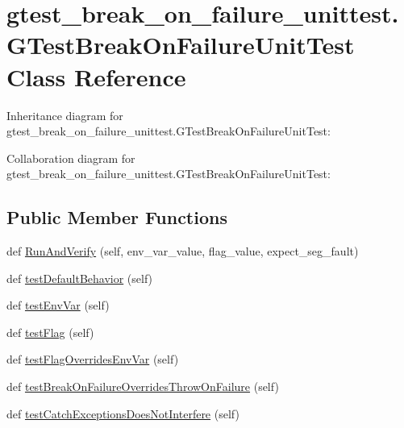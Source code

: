 \hypertarget{classgtest__break__on__failure__unittest_1_1_g_test_break_on_failure_unit_test}{}\section{gtest\+\_\+break\+\_\+on\+\_\+failure\+\_\+unittest.\+G\+Test\+Break\+On\+Failure\+Unit\+Test Class Reference}
\label{classgtest__break__on__failure__unittest_1_1_g_test_break_on_failure_unit_test}


Inheritance diagram for gtest\+\_\+break\+\_\+on\+\_\+failure\+\_\+unittest.\+G\+Test\+Break\+On\+Failure\+Unit\+Test\+:


Collaboration diagram for gtest\+\_\+break\+\_\+on\+\_\+failure\+\_\+unittest.\+G\+Test\+Break\+On\+Failure\+Unit\+Test\+:
\subsection*{Public Member Functions}
\begin{DoxyCompactItemize}
\item 
def \hyperlink{classgtest__break__on__failure__unittest_1_1_g_test_break_on_failure_unit_test_a0a66475873f545d88655b8bb14368f2e}{Run\+And\+Verify} (self, env\+\_\+var\+\_\+value, flag\+\_\+value, expect\+\_\+seg\+\_\+fault)
\item 
def \hyperlink{classgtest__break__on__failure__unittest_1_1_g_test_break_on_failure_unit_test_a8c21b7ecccc27268cb6c3d30b933b812}{test\+Default\+Behavior} (self)
\item 
def \hyperlink{classgtest__break__on__failure__unittest_1_1_g_test_break_on_failure_unit_test_a2beae948940a4fd898c8183c3bb221da}{test\+Env\+Var} (self)
\item 
def \hyperlink{classgtest__break__on__failure__unittest_1_1_g_test_break_on_failure_unit_test_af6018e5253c1107c5afaba3e2cb573fe}{test\+Flag} (self)
\item 
def \hyperlink{classgtest__break__on__failure__unittest_1_1_g_test_break_on_failure_unit_test_a15836ddb27e51e9aaf2f8aad84f5cef7}{test\+Flag\+Overrides\+Env\+Var} (self)
\item 
def \hyperlink{classgtest__break__on__failure__unittest_1_1_g_test_break_on_failure_unit_test_a3c5855e045236a309a5bff73ee6b503e}{test\+Break\+On\+Failure\+Overrides\+Throw\+On\+Failure} (self)
\item 
def \hyperlink{classgtest__break__on__failure__unittest_1_1_g_test_break_on_failure_unit_test_a70cc7732ac68ffe587657a3a5309aa4a}{test\+Catch\+Exceptions\+Does\+Not\+Interfere} (self)
\end{DoxyCompactItemize}


